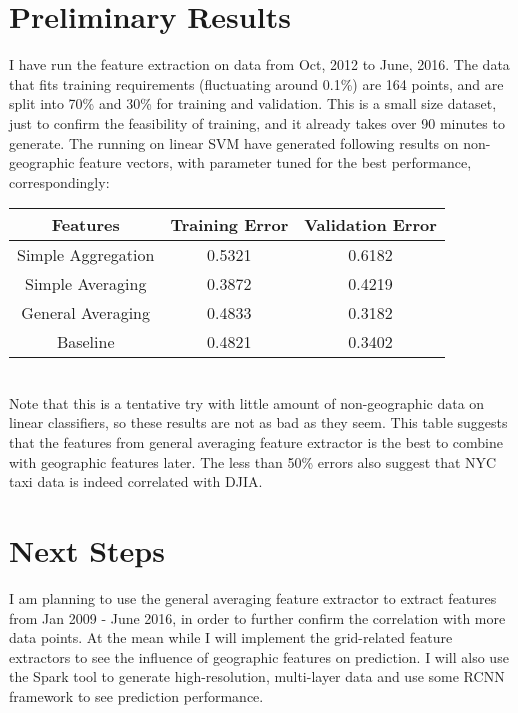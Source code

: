 \documentclass[a4paper]{article}
\begin{document}
\section{Preliminary Results}
I have run the feature extraction on data from Oct, 2012 to June, 2016. The data that fits training requirements (fluctuating around 0.1\%) are 164 points, and are split into 70\% and 30\% for training and validation. This is a small size dataset, just to confirm the feasibility of training, and it already takes over 90 minutes to generate. The running on linear SVM have generated following results on non-geographic feature vectors, with parameter tuned for the best performance, correspondingly: \\
\begin{center}
 \begin{tabular}{|c|| c| c|} 
 \hline
Features & Training Error & Validation Error \\ [0.5ex] 
 \hline
 Simple Aggregation & 0.5321 & 0.6182 \\ 
 \hline
Simple Averaging & 0.3872 & 0.4219 \\
 \hline
General Averaging & 0.4833 & 0.3182 \\
 \hline
Baseline & 0.4821 & 0.3402 \\
 \hline
\end{tabular}
\end{center}\ \ \\
Note that this is a tentative try with little amount of non-geographic data on linear classifiers, so these results are not as bad as they seem. This table suggests that the features from general averaging feature extractor is the best to combine with geographic features later. The less than 50\% errors also suggest that NYC taxi data is indeed correlated with DJIA.  
\section{Next Steps}
I am planning to use the general averaging feature extractor to extract features from Jan 2009 - June 2016, in order to further confirm the correlation with more data points. At the mean while I will
implement the grid-related feature extractors to see the influence of geographic features on prediction. I will also use the Spark tool to generate high-resolution, multi-layer data and use some RCNN framework to see prediction performance.
\end{document}
